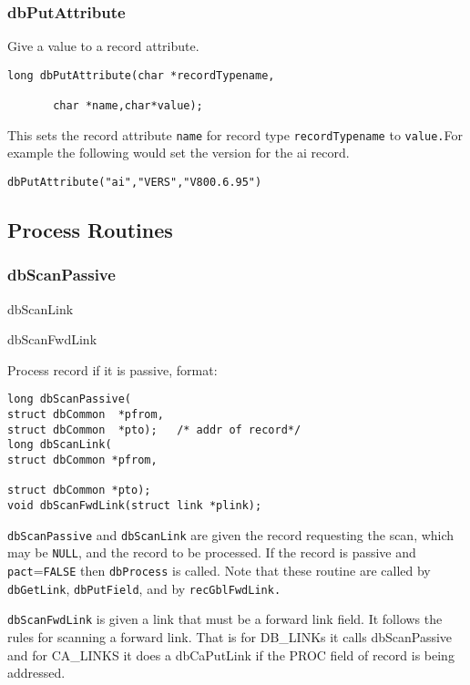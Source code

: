 \subsubsection{dbPutAttribute}

Give a value to a record attribute.

\begin{verbatim}long dbPutAttribute(char *recordTypename,

       char *name,char*value);
\end{verbatim}This sets the record attribute \verb|name| for record type \verb|recordTypename| to \verb|value.|For example the following would set 
the version for the ai record.

\begin{verbatim}dbPutAttribute("ai","VERS","V800.6.95")
\end{verbatim}\subsection{Process Routines}

\subsubsection{dbScanPassive}

dbScanLink

dbScanFwdLink

Process record if it is passive, format:

\begin{verbatim}long dbScanPassive(
struct dbCommon  *pfrom,
struct dbCommon  *pto);   /* addr of record*/
long dbScanLink(
struct dbCommon *pfrom,

struct dbCommon *pto);
void dbScanFwdLink(struct link *plink);
\end{verbatim}
 \verb|dbScanPassive| and \verb|dbScanLink| are given the record requesting the scan, which may be \verb|NULL|, and the record to 
be processed. If the record is passive and \verb|pact|=\verb|FALSE| then \verb|dbProcess| is called. Note that these routine are called by 
\verb|dbGetLink|, \verb|dbPutField|, and by \verb|recGblFwdLink.|

\verb|dbScanFwdLink| is given a link that must be a forward link field. It follows the rules for scanning a forward link. That 
is for DB\_LINKs it calls dbScanPassive and for CA\_LINKS it does a dbCaPutLink if the PROC field of record is being 
addressed.

